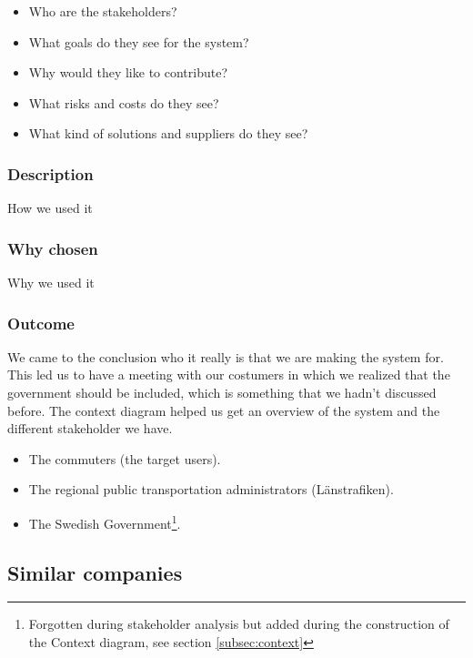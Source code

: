 \documentclass[a4paper]{article}
\begin{document}
    \begin{itemize}
      \item Who are the stakeholders?
      \item What goals do they see for the system?
      \item Why would they like to contribute?
      \item What risks and costs do they see?
      \item What kind of solutions and suppliers do they see?
    \end{itemize}
    
    \subsubsection{Description}
    How we used it
    \subsubsection{Why chosen}
    Why we used it
    \subsubsection{Outcome}
    We came to the conclusion who it really is that we are making the system for. This led us to have a meeting with our costumers in which we realized that the government should be included, which is something that we hadn't discussed before.
    The context diagram helped us get an overview of the system and the different stakeholder we have.

    \begin{itemize}
      \item The commuters (the target users). 
      \item The regional public transportation administrators (Länstrafiken). 
      \item The Swedish Government\footnote{Forgotten during stakeholder analysis but added during the construction of the Context diagram, see section \ref{subsec:context}}.
    \end{itemize}
    
    
    \subsection{Similar companies}
\end{document}
